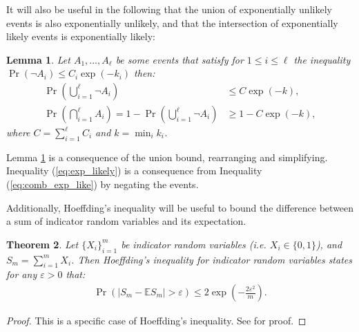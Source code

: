 \documentclass{article}
\newcommand{\bb}[1]{\mathbb{#1}}
\theoremstyle{plain}
\newtheorem{theorem}{Theorem}[section]
\newtheorem{lemma}[theorem]{Lemma}
\newenvironment{proofoutline}{\proof[Proof outline]}{\endproof}
\begin{document}
\begin{appendices}
    
    
    
    
        
        It will also be useful in the following that the union of exponentially unlikely events is also exponentially unlikely, and that the intersection of exponentially likely events is exponentially likely:
        \begin{lemma} \label{lem:union_bound}
            Let $A_1,...,A_{\ell}$ be some events that satisfy for $1\leq i \leq \ell$ the inequality $\Pr(\lnot A_i) \leq C_i\exp(-k_i)$ then:
            \begin{align}
                \Pr\left(\bigcup_{i=1}^\ell \lnot A_i\right) &\leq C\exp(-k), \label{eq:comb_exp_like} \\
                \Pr\left(\bigcap_{i=1}^\ell A_i\right) = 1-\Pr\left(\bigcup_{i=1}^\ell \lnot A_i\right) &\geq 1-C\exp(-k), \label{eq:exp_likely}
            \end{align}
            where $C=\sum_{i=1}^\ell C_i$ and $k = \min_i k_i$.
        \end{lemma}
        
        \begin{proofoutline}
            Lemma \ref{lem:union_bound} is a consequence of the union bound, rearranging and simplifying. Inequality (\ref{eq:exp_likely}) is a consequence from Inequality (\ref{eq:comb_exp_like}) by negating the events.
        \end{proofoutline}
    





    
    
        Additionally, Hoeffding's inequality will be useful to bound the difference between a sum of indicator random variables and its expectation. 
        \begin{theorem} \label{thrm:hoeffding}
            Let $\{X_i\}_{i=1}^m$ be indicator random variables (i.e. $X_i\in\{0,1\}$), and $S_m=\sum_{i=1}^m X_i$. Then Hoeffding's inequality for indicator random variables states for any $\varepsilon > 0$ that:
            \begin{align}
                \Pr(|S_m - \bb{E}S_m|>\varepsilon)\leq 2\exp\left(-\frac{2\varepsilon^2}{m}\right).
            \end{align}
        \end{theorem}
        \begin{proof}
            This is a specific case of Hoeffding's inequality. See  for proof.
        \end{proof}
    






\end{appendices}
\end{document}
